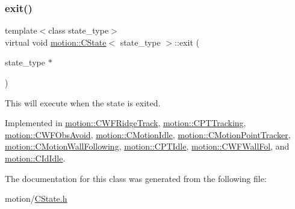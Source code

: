 \mbox{\label{classmotion_1_1CState_a353db064c159d66b82bf257b35e7c016}} 
\subsubsection{\texorpdfstring{exit()}{exit()}}
{\footnotesize\ttfamily template$<$class state\+\_\+type$>$ \\
virtual void \mbox{\hyperlink{classmotion_1_1CState}{motion\+::\+C\+State}}$<$ state\+\_\+type $>$\+::exit (\begin{DoxyParamCaption}\item[{state\+\_\+type $\ast$}]{ }\end{DoxyParamCaption})\hspace{0.3cm}{\ttfamily [pure virtual]}}

This will execute when the state is exited. 

Implemented in \mbox{\hyperlink{classmotion_1_1CWFRidgeTrack_a15ab958b412e2e6a70619822e6697f7f}{motion\+::\+C\+W\+F\+Ridge\+Track}}, \mbox{\hyperlink{classmotion_1_1CPTTracking_aa7a6294200e0dd2c0d53f852558d7d89}{motion\+::\+C\+P\+T\+Tracking}}, \mbox{\hyperlink{classmotion_1_1CWFObsAvoid_af95e36cbc64c2c47fdf5d6ad5dde90a8}{motion\+::\+C\+W\+F\+Obs\+Avoid}}, \mbox{\hyperlink{classmotion_1_1CMotionIdle_a2488eb5516673fd8e188da01a9e4bc51}{motion\+::\+C\+Motion\+Idle}}, \mbox{\hyperlink{classmotion_1_1CMotionPointTracker_ae40c6dc8e2883a6293b2ea5994b0e3d1}{motion\+::\+C\+Motion\+Point\+Tracker}}, \mbox{\hyperlink{classmotion_1_1CMotionWallFollowing_a24be76c786b3a4bd476cc9b3c8955c26}{motion\+::\+C\+Motion\+Wall\+Following}}, \mbox{\hyperlink{classmotion_1_1CPTIdle_aed48db9a7d0c9364c1f93bf0787810a4}{motion\+::\+C\+P\+T\+Idle}}, \mbox{\hyperlink{classmotion_1_1CWFWallFol_af90587d832a04a15d6c166e9b6a6afed}{motion\+::\+C\+W\+F\+Wall\+Fol}}, and \mbox{\hyperlink{classmotion_1_1CIdIdle_aa54a27090c4f10a9a2c5130d9baf14a3}{motion\+::\+C\+Id\+Idle}}.



The documentation for this class was generated from the following file\+:\begin{DoxyCompactItemize}
\item 
motion/\mbox{\hyperlink{CState_8h}{C\+State.\+h}}\end{DoxyCompactItemize}
